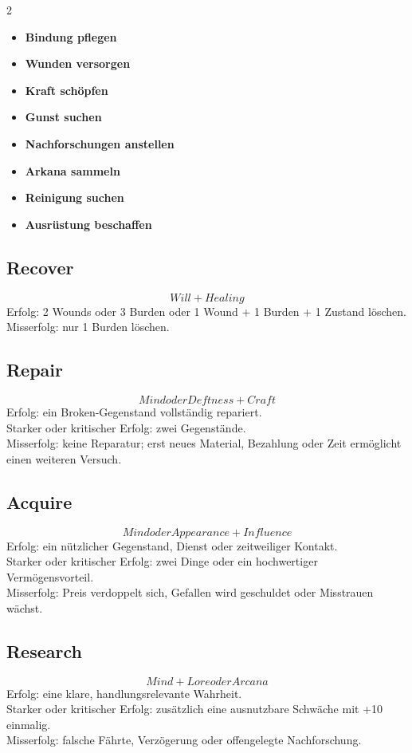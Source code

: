 \begin{multicols*}{2}
\begin{itemize}[leftmargin=*]
\item \textbf{Bindung pflegen}
\item \textbf{Wunden versorgen}
\item \textbf{Kraft schöpfen}
\item \textbf{Gunst suchen}
\item \textbf{Nachforschungen anstellen}
\item \textbf{Arkana sammeln}
\item \textbf{Reinigung suchen}
\item \textbf{Ausrüstung beschaffen}
\end{itemize}

\subsection{Recover}
\[
Will + Healing
\]
Erfolg: 2 Wounds oder 3 Burden oder 1 Wound + 1 Burden + 1 Zustand löschen.\\
Misserfolg: nur 1 Burden löschen.

\subsection{Repair}
\[
Mind oder Deftness + Craft
\]
Erfolg: ein Broken-Gegenstand vollständig repariert.\\
Starker oder kritischer Erfolg: zwei Gegenstände.\\
Misserfolg: keine Reparatur; erst neues Material, Bezahlung oder Zeit ermöglicht einen weiteren Versuch.

\subsection{Acquire}
\[
Mind oder Appearance + Influence
\]
Erfolg: ein nützlicher Gegenstand, Dienst oder zeitweiliger Kontakt.\\
Starker oder kritischer Erfolg: zwei Dinge oder ein hochwertiger Vermögensvorteil.\\
Misserfolg: Preis verdoppelt sich, Gefallen wird geschuldet oder Misstrauen wächst.

\subsection{Research}
\[
Mind + Lore oder Arcana
\]
Erfolg: eine klare, handlungsrelevante Wahrheit.\\
Starker oder kritischer Erfolg: zusätzlich eine ausnutzbare Schwäche mit +10 einmalig.\\
Misserfolg: falsche Fährte, Verzögerung oder offengelegte Nachforschung.


\end{multicols*}
